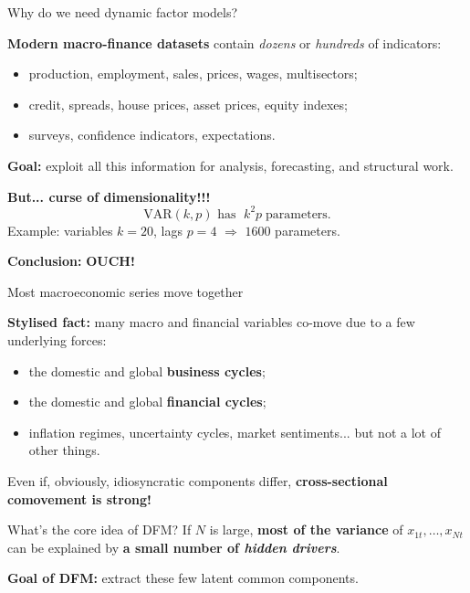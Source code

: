 \documentclass{beamer}
\begin{document}
\begin{frame}{Why do we need dynamic factor models?}
\small

\textbf{Modern macro-finance datasets} contain \textit{dozens} or \textit{hundreds} of indicators:
\begin{itemize}
  \item production, employment, sales, prices, wages, multisectors;
  \item credit, spreads, house prices, asset prices, equity indexes;
  \item surveys, confidence indicators, expectations.
\end{itemize}

\medskip
\textbf{Goal:} exploit all this information for analysis, forecasting, and structural work.

\medskip
\pause
\textbf{But... curse of dimensionality!!!}
\[
\text{VAR}(k,p) \text{ has } \; k^2 p \; \text{parameters.}
\]
Example: variables $k=20$, lags $p=4$ $\Rightarrow$ $1600$ parameters.

\medskip
\textbf{Conclusion:} \textbf{OUCH!}

\end{frame}




\begin{frame}{Most macroeconomic series move together}
\small

\textbf{Stylised fact:} many macro and financial variables co-move due to a few
underlying forces:
\begin{itemize}
  \item the domestic and global \textbf{business cycles};
  \item the domestic and global \textbf{financial cycles};
  \item inflation regimes, uncertainty cycles, market sentiments... but not a lot of other things.
\end{itemize}

\medskip
Even if, obviously, idiosyncratic components differ, \textbf{cross-sectional comovement is strong!}

\pause
\begin{block}{What's the core idea of DFM?}
If $N$ is large,\textbf{ most of the variance} of $x_{1t},\dots,x_{Nt}$ can be explained
by \textbf{a small number of\textit{ hidden drivers}}.
\end{block}

\medskip
\textbf{Goal of DFM:} extract these few latent common components.
\end{frame}
\end{document}
